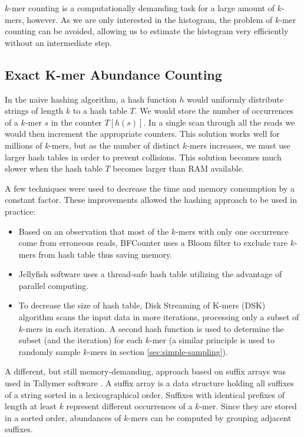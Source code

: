 $k$-mer counting is a computationally demanding task for a large amount of $k$-mers, however.
As we are only interested in the histogram, the problem of $k$-mer counting can be avoided,
allowing us to estimate the histogram very efficiently without an intermediate step.

\subsection{Exact K-mer Abundance Counting}
\label{sec:exact-algorithms}
In the naive hashing algorithm, a hash function $h$ would uniformly distribute strings of
length $k$ to a hash table $T$. We would store the number of occurrences of a $k$-mer
$s$ in the counter $T[h(s)]$. In a single scan through all the reads we
would then increment the appropriate counters. This solution works well for
millions of $k$-mers, but as the number of distinct $k$-mers increases,
we must use larger hash tables in order to prevent collisions.
This solution becomes much slower when the hash table $T$ becomes larger than RAM available.

A few techniques were used to decrease the time and memory consumption by a constant factor. 
These improvements allowed the hashing approach to be used in practice:

\begin{itemize}
\item Based on an observation that most of the $k$-mers with only one occurrence come from
erroneous reads, BFCounter \cite{Melsted2011} uses a Bloom filter to exclude rare $k$-mers
from hash table thus saving memory.

\item Jellyfish \cite{Marcais2011} software uses a thread-safe hash table utilizing the 
advantage of parallel computing.

\item To decrease the size of hash table, Disk Streaming of K-mers (DSK) \cite{Rizk2013}
algorithm scans the input data in more iterations, processing only a subset of $k$-mers
in each iteration. A second hash function is used to determine the subset (and the iteration) 
for each $k$-mer (a similar principle is used to randomly sample $k$-mers 
in section \ref{sec:simple-sampling}).
\end{itemize}

A different, but still memory-demanding, approach based on suffix arrays was
used in Tallymer software \cite{Kurtz2008}. A suffix array is a data structure
holding all suffixes of a string sorted in a lexicographical order. Suffixes with identical
prefixes of length at least $k$ represent different occurrences of a $k$-mer. Since
they are stored in a sorted order, abundances of $k$-mers can be computed by
grouping adjacent suffixes. 

